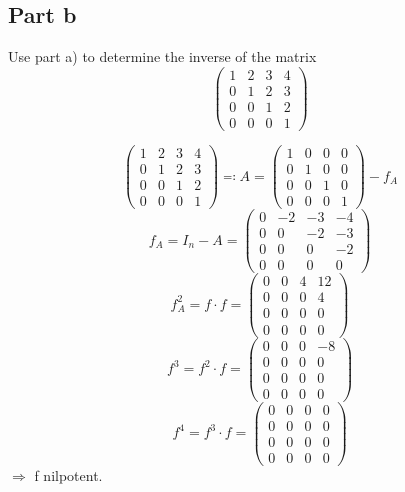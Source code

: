 \documentclass[a4paper]{article}
\theoremstyle{definition}
\begin{document}
\subsection{Part b}
\begin{ex}
  Use part a) to determine the inverse of the matrix
  \[
    \begin{pmatrix}
      1 & 2 & 3 & 4 \\
      0 & 1 & 2 & 3 \\
      0 & 0 & 1 & 2 \\
      0 & 0 & 0 & 1
    \end{pmatrix}
  \]
\end{ex}
\[
  \begin{pmatrix}
    1 & 2 & 3 & 4 \\
    0 & 1 & 2 & 3 \\
    0 & 0 & 1 & 2 \\
    0 & 0 & 0 & 1
  \end{pmatrix}
  \eqqcolon A
  = \begin{pmatrix}
    1 & 0 & 0 & 0 \\
    0 & 1 & 0 & 0 \\
    0 & 0 & 1 & 0 \\
    0 & 0 & 0 & 1
  \end{pmatrix}
  - f_A
\] \[
  f_A = I_n - A =
  \begin{pmatrix}
    0 & -2 & -3 & -4 \\
    0 & 0 & -2 & -3 \\
    0 & 0 & 0 & -2 \\
    0 & 0 & 0 & 0
  \end{pmatrix}
\] \[
  f^2_A = f \cdot f = \begin{pmatrix} 0 & 0 & 4 & 12 \\ 0 & 0 & 0 & 4 \\ 0 & 0 & 0 & 0 \\ 0 & 0 & 0 & 0 \end{pmatrix}
\] \[
  f^3 = f^2 \cdot f = \begin{pmatrix} 0 & 0 & 0 & -8 \\ 0 & 0 & 0 & 0 \\ 0 & 0 & 0 & 0 \\ 0 & 0 & 0 & 0 \end{pmatrix}
\] \[
  f^4 = f^3 \cdot f = \begin{pmatrix} 0 & 0 & 0 & 0 \\ 0 & 0 & 0 & 0 \\ 0 & 0 & 0 & 0 \\ 0 & 0 & 0 & 0 \end{pmatrix}
\]
$\Rightarrow$ f nilpotent.
\end{document}
